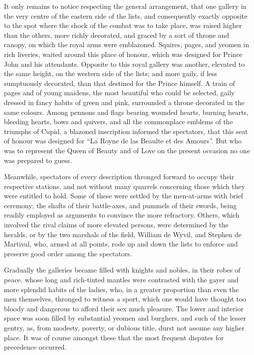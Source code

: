 It only remains to notice respecting the general arrangement, that one
gallery in the very centre of the eastern side of the lists, and
consequently exactly opposite to the spot where the shock of the combat
was to take place, was raised higher than the others, more richly
decorated, and graced by a sort of throne and canopy, on which the royal
arms were emblazoned. Squires, pages, and yeomen in rich liveries,
waited around this place of honour, which was designed for Prince John
and his attendants. Opposite to this royal gallery was another, elevated
to the same height, on the western side of the lists; and more gaily, if
less sumptuously decorated, than that destined for the Prince himself. A
train of pages and of young maidens, the most beautiful who could be
selected, gaily dressed in fancy habits of green and pink, surrounded a
throne decorated in the same colours. Among pennons and flags bearing
wounded hearts, burning hearts, bleeding hearts, bows and quivers, and
all the commonplace emblems of the triumphs of Cupid, a blazoned
inscription informed the spectators, that this seat of honour was
designed for ``La Royne de las Beaulte et des Amours''. But who was to
represent the Queen of Beauty and of Love on the present occasion no one
was prepared to guess.

Meanwhile, spectators of every description thronged forward to occupy
their respective stations, and not without many quarrels concerning
those which they were entitled to hold. Some of these were settled by
the men-at-arms with brief ceremony; the shafts of their battle-axes,
and pummels of their swords, being readily employed as arguments to
convince the more refractory. Others, which involved the rival claims of
more elevated persons, were determined by the heralds, or by the two
marshals of the field, William de Wyvil, and Stephen de Martival, who,
armed at all points, rode up and down the lists to enforce and preserve
good order among the spectators.

Gradually the galleries became filled with knights and nobles, in their
robes of peace, whose long and rich-tinted mantles were contrasted with
the gayer and more splendid habits of the ladies, who, in a greater
proportion than even the men themselves, thronged to witness a sport,
which one would have thought too bloody and dangerous to afford their
sex much pleasure. The lower and interior space was soon filled by
substantial yeomen and burghers, and such of the lesser gentry, as, from
modesty, poverty, or dubious title, durst not assume any higher place.
It was of course amongst these that the most frequent disputes for
precedence occurred.

